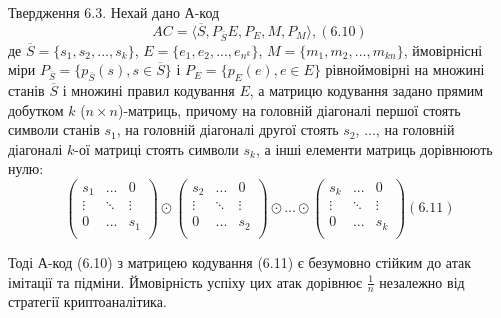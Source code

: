 \begin{claim}
    Твердження 6.3. Нехай дано А-код
    \begin{equation}
        AC = \langle \overline{S}, P_{\overline{S}} E, P_E, M, P_M \rangle, (6.10)
    \end{equation}
    де $\overline{S} = \{s_1, s_2, ..., s_k\}$, $E = \{e_1, e_2, ..., e_{n^k}\}$,
    $M = \{m_1, m_2, ..., m_{kn}\}$, ймовірнісні міри
    $P_{\overline{S}} = \{p_{\overline{S}}(s), s \in \overline{S}\}$ і $P_E = \{p_E(e), e \in E\}$ рівноймовірні на множині станів $\overline{S}$ і
    множині правил кодування $E$, а матрицю кодування задано прямим добутком $k$
    ($n \times n$)-матриць, причому на головній діагоналі першої стоять символи станів
    $s_1$, на головній діагоналі другої стоять $s_2$, $...$, на головній діагоналі $k$-ої матриці
    стоять символи $s_k$, а інші елементи матриць дорівнюють нулю:
    \begin{equation}
        \begin{pmatrix}
            s_1 & ... & 0 \\
            \vdots & \ddots & \vdots \\
            0 & ... & s_1 \\
        \end{pmatrix}
        \odot \begin{pmatrix}
            s_2 & ... & 0 \\
            \vdots & \ddots & \vdots \\
            0 & ... & s_2 \\ 
        \end{pmatrix}
        \odot ...
        \odot \begin{pmatrix}
            s_k & ... & 0 \\
            \vdots & \ddots & \vdots \\
            0 & ... & s_k \\ 
        \end{pmatrix} (6.11)
    \end{equation}
    
    Тоді А-код (6.10) з матрицею кодування (6.11) є безумовно стійким до атак імітації
    та підміни. Ймовірність успіху цих атак дорівнює $\frac{1}{n}$ незалежно від стратегії
    криптоаналітика.
\end{claim}

